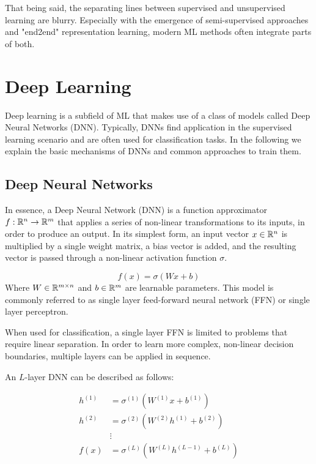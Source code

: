 That being said, the separating lines between supervised and unsupervised learning are blurry. Especially with the emergence of semi-supervised approaches and "end2end" representation learning, modern ML methods often integrate parts of both.

\section{Deep Learning}
Deep learning is a subfield of ML that makes use of a class of models called Deep Neural Networks (DNN). Typically, DNNs find application in the supervised learning scenario and are often used for classification tasks. In the following we explain the basic mechanisms of DNNs and common approaches to train them.

\subsection{Deep Neural Networks}
In essence, a Deep Neural Network (DNN) is a function approximator $f: \mathbb{R}^n \rightarrow \mathbb{R}^m$ that applies a series of non-linear transformations to its inputs, in order to produce an output. In its simplest form, an input vector $x \in \mathbb{R}^n$ is multiplied by a single weight matrix, a bias vector is added, and the resulting vector is passed through a non-linear activation function $\sigma$.

\begin{equation}
    f(x) = \sigma(W x + b)
\end{equation}
Where $W \in \mathbb{R}^{m \times n}$ and $b \in \mathbb{R}^{m}$ are learnable parameters.
This model is commonly referred to as single layer feed-forward neural network (FFN) or single layer perceptron.

When used for classification, a single layer FFN is limited to problems that require linear separation. In order to learn more complex, non-linear decision boundaries, multiple layers can be applied in sequence.

An $L$-layer DNN can be described as follows:

\begin{equation}
    \label{eq:DNN}
    \begin{split}
        h^{(1)} &= \sigma^{(1)}(W^{(1)} x + b^{(1)}) \\
        h^{(2)} &= \sigma^{(2)}(W^{(2)} h^{(1)} + b^{(2)}) \\
        & \vdots \\
        f(x) &= \sigma^{(L)}(W^{(L)} h^{(L-1)} + b^{(L)})
    \end{split}
\end{equation}

